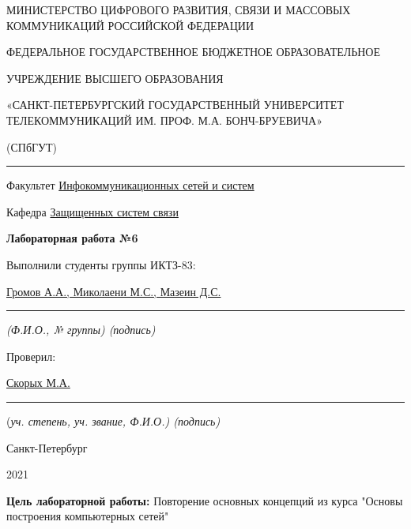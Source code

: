 \documentclass[a4paper,14pt]{extarticle}
\begin{document}
    \begin{center}
        \thispagestyle{empty}
        \begin{singlespace}
        МИНИСТЕРСТВО ЦИФРОВОГО РАЗВИТИЯ, СВЯЗИ И МАССОВЫХ КОММУНИКАЦИЙ РОССИЙСКОЙ ФЕДЕРАЦИИ

        ФЕДЕРАЛЬНОЕ ГОСУДАРСТВЕННОЕ БЮДЖЕТНОЕ ОБРАЗОВАТЕЛЬНОЕ

        УЧРЕЖДЕНИЕ ВЫСШЕГО ОБРАЗОВАНИЯ

        «САНКТ-ПЕТЕРБУРГСКИЙ ГОСУДАРСТВЕННЫЙ УНИВЕРСИТЕТ ТЕЛЕКОММУНИКАЦИЙ ИМ. ПРОФ. М.А. БОНЧ-БРУЕВИЧА»

        (СПбГУТ)
        \end{singlespace}
        \vspace{-1ex}
        \rule{\textwidth}{0.4pt}
        \vspace{-5ex}

        Факультет \underline{Инфокоммуникационных сетей и систем}

        Кафедра \underline{Защищенных систем связи}
        \vspace{10ex}

        \textbf{Лабораторная работа №6}

    \end{center}
    \vspace{4ex}
    \begin{flushright}
    \parbox{10 cm}{
    \begin{flushleft}
        Выполнили студенты группы ИКТЗ-83:

        \underline{Громов А.А., Миколаени М.С., Мазеин Д.С.} \hfill \rule[-0.85ex]{0.1\textwidth}{0.6pt}

        \footnotesize \textit{ (Ф.И.О., № группы) \hfill (подпись)} \normalsize

        Проверил:

        \underline{Скорых М.А.} \hfill \rule[-0.85ex]{0.1\textwidth}{0.6pt}

        (\footnotesize \textit{уч. степень, уч. звание, Ф.И.О.) \hfill (подпись)} \normalsize

    \end{flushleft}
    }
    \end{flushright}
    \begin{center}
        \vfill
        Санкт-Петербург

        2021

    \end{center}
    \newpage

    \textbf{Цель лабораторной работы:}
    Повторение основных концепций из курса "Основы построения компьютерных сетей"
    
\end{document}
